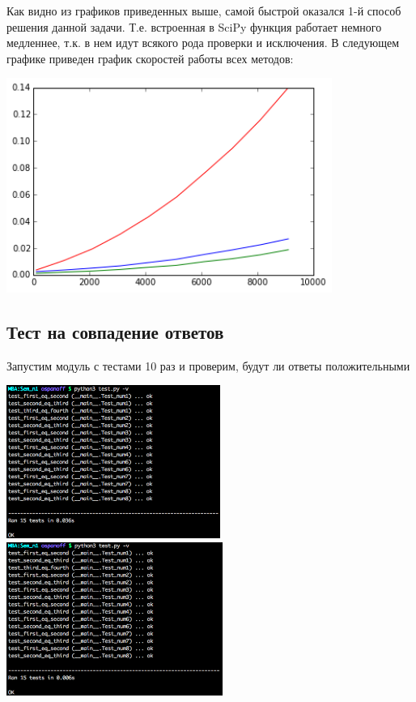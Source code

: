 \documentclass[12pt, a4paper]{article}
\begin{document}
				Как видно из графиков приведенных выше, самой быстрой оказался 1-й способ решения данной задачи. Т.е. встроенная в SciPy функция работает немного медленнее, т.к. в нем идут всякого рода проверки и исключения. В следующем графике приведен график скоростей работы всех методов:
				\begin{center}
					\includegraphics[height=7cm]{timeit/num8_ti123.png}
				\end{center}



		\newpage
		\subsection{Тест на совпадение ответов}
			Запустим модуль с тестами 10 раз и проверим, будут ли ответы положительными

			\begin{center}
				\includegraphics[height=5cm]{test/1.png}
				\includegraphics[height=5cm]{test/2.png}
			\end{center}
\end{document}
